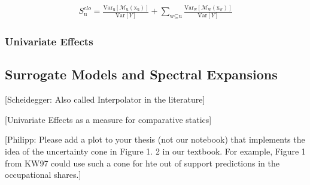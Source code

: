 \begin{align}
S_\text{u}^{clo} = \frac{\text{Var}_\text{u}[\mathcal{M}_\text{u}(\text{x}_\text{u})]}{\text{Var}[Y]} +  \sum_{\text{w} \subseteq \text{u}} \frac{\text{Var}_\text{w}[\mathcal{M}_\text{w}(\text{x}_\text{w})]}{\text{Var}[Y]}
\end{align}

\subsubsection{Univariate Effects}

\subsection{Surrogate Models and Spectral Expansions}

[Scheidegger: Also called Interpolator in the literature]

[Univariate Effects as a measure for comparative statics]

[Philipp: Please add a plot to your thesis (not our notebook) that implements the idea of the uncertainty cone in Figure 1. 2 in our textbook. For example, Figure 1 from KW97 could use such a cone for hte out of support predictions in the occupational shares.]

\newpage
